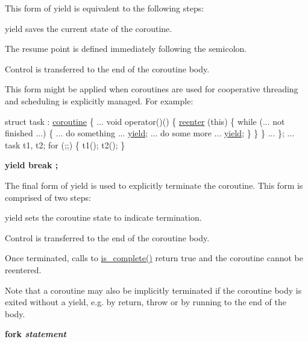 This form of {\ttfamily yield} is equivalent to the following steps\+:

\begin{DoxyItemize}
\item {\ttfamily yield} saves the current state of the coroutine. \item The resume point is defined immediately following the semicolon. \item Control is transferred to the end of the coroutine body.\end{DoxyItemize}
This form might be applied when coroutines are used for cooperative threading and scheduling is explicitly managed. For example\+:


\begin{DoxyCode}
 \textcolor{keyword}{struct }task : \hyperlink{classasio_1_1coroutine_aae689a0aee08699c9d68bdc9d246b5cb}{coroutine}
\{
  ...
  \textcolor{keywordtype}{void} operator()()
  \{
    \hyperlink{yield_8hpp_a845826f234aec2b016cac4e60aff9bb5}{reenter} (\textcolor{keyword}{this})
    \{
      \textcolor{keywordflow}{while} (... not finished ...)
      \{
        ... \textcolor{keywordflow}{do} something ...
        \hyperlink{yield_8hpp_abaa9287233697b1cd0175180304c7e1d}{yield};
        ... \textcolor{keywordflow}{do} some more ...
        \hyperlink{yield_8hpp_abaa9287233697b1cd0175180304c7e1d}{yield};
      \}
    \}
  \}
  ...
\};
...
task t1, t2;
\textcolor{keywordflow}{for} (;;)
\{
  t1();
  t2();
\} 
\end{DoxyCode}


{\bfseries yield break ;}

The final form of {\ttfamily yield} is used to explicitly terminate the coroutine. This form is comprised of two steps\+:

\begin{DoxyItemize}
\item {\ttfamily yield} sets the coroutine state to indicate termination. \item Control is transferred to the end of the coroutine body.\end{DoxyItemize}
Once terminated, calls to \hyperlink{classasio_1_1coroutine_a31134bbc275316e9bea1e08df9021a68}{is\+\_\+complete()} return true and the coroutine cannot be reentered.

Note that a coroutine may also be implicitly terminated if the coroutine body is exited without a yield, e.\+g. by return, throw or by running to the end of the body.

{\bfseries fork {\itshape statement}}

